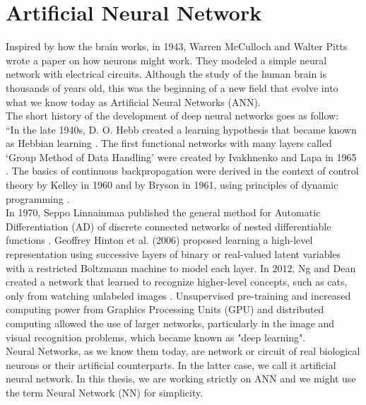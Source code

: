 \section{Artificial Neural Network}
Inspired by how the brain works, in 1943, Warren McCulloch and Walter Pitts \cite{mcculloch1943logical} wrote a paper on how neurons might work. They modeled a simple neural network with electrical circuits. Although the study of the human brain is thousands of years old, this was the beginning of a new field that evolve into what we know today as Artificial Neural Networks (ANN).\\
The short history of the development of deep neural networks goes as follow:\\
``In the late 1940s, D. O. Hebb created a learning hypothesis that became known as Hebbian learning \cite{hebb1949organization}. 
The first functional networks with many layers called `Group Method of Data Handling' were created by Ivakhnenko and Lapa in 1965 \cite{schmidhuber2015deep, ivakhnenko1973cybernetic, ivakhnenko1967cybernetics}. 
The basics of continuous backpropagation \cite{schmidhuber2015deep, dreyfus1990artificial, mizutani2000derivation} were derived in the context of control theory by Kelley \cite{kelley1960gradient} in 1960 and by Bryson in 1961, using principles of dynamic programming \cite{bryson1961gradient}.\\
In 1970, Seppo Linnainmaa published the general method for Automatic Differentiation (AD) of discrete connected networks of nested differentiable functions \cite{linnainmaa1970representation, linnainmaa1976taylor}.
Geoffrey Hinton et al. (2006) proposed learning a high-level representation using successive layers of binary or real-valued latent variables with a restricted Boltzmann machine \cite{smolensky1986information} to model each layer. In 2012, Ng and Dean created a network that learned to recognize higher-level concepts, such as cats, only from watching unlabeled images \cite{le2013building}. Unsupervised pre-training and increased computing power from Graphics Processing Units (GPU) and distributed computing allowed the use of larger networks, particularly in the image and visual recognition problems, which became known as "deep learning".\\
Neural Networks, as we know them today, are network or circuit of real biological neurons or their artificial counterparts. In the latter case, we call it artificial neural network. In this thesis, we are working strictly on ANN and we might use the term Neural Network (NN) for simplicity.\\ 
